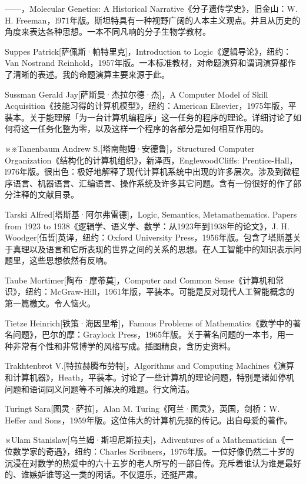 \documentclass[
  12pt,
  twoside,
  openright,
  oldfontcommands,
]{memoir}
\begin{document}
------，Molecular Genetics: A Historical
Narrative《分子遗传学史》，旧金山：W. H.
Freeman，l971年版。斯坦特具有一种视野广阔的人本主义观点。并且从历史的角度来表达各种思想。一本不同凡响的分子生物学教材。

Suppes Patrick{[}萨佩斯·帕特里克{]}，Introduction to
Logic《逻辑导论》，纽约：Van Nostrand
Reinhold，1957年版。一本标准教材，对命题演算和谓词演算都作了清晰的表述。我的命题演算主要来源于此。

Sussman Gerald Jay{[}萨斯曼·杰拉尔德·杰{]}，A Computer Model of Skill
Acquisition《技能习得的计算机模型》，纽约：American
Elsevier，1975年版，平装本。关于能理解「为一台计算机编程序」这一任务的程序的理论。详细讨论了如何将这一任务化整为零，以及这样一个程序的各部分是如何相互作用的。

※※Tanenbaum Andrew S.{[}塔南鲍姆·安德鲁{]}，Structured Computer
Organization《结构化的计算机组织》，新泽西，EnglewoodCliffs:
Prentice-Hall，l976年版。很出色：极好地解释了现代计算机系统中出现的许多层次。涉及到微程序语言、机器语言、汇编语言、操作系统及许多其它问题。含有一份很好的作了部分注释的文献目录。

Tarski Alfred{[}塔斯基·阿尔弗雷德{]}，Logic, Semantics, Metamathematics.
Papers from 1923 to
1938《逻辑学、语义学、数学：从1923年到1938年的论文》，J. H.
Woodger{[}伍哲{]}英译，纽约：Oxford University
Press，1956年版。包含了塔斯基关于真理以及语言和它所表现的世界之间的关系的思想。在人工智能中的知识表示问题里，这些思想依然有反响。

Taube Mortimer{[}陶布·摩蒂莫{]}，Computer and Common
Sense《计算机和常识》，纽约：McGraw-Hill，1961年版，平装本。可能是反对现代人工智能概念的第一篇檄文。令人恼火。

Tietze Heinrich{[}铁策·海因里希{]}，Famous Problems of
Mathematics《数学中的著名问题》，巴尔的摩：Graylock
Press，1965年版。关于著名问题的一本书，用一种非常有个性和非常博学的风格写成。插图精良，含历史资料。

Trakhtenbrot V.{[}特拉赫腾布劳特{]}，Algorithms and Computing
Machines《演算和计算机器》，Heath，平装本。讨论了一些计算机的理论问题，特别是诸如停机问题和语词同义问题等不可解决的难题。行文简洁。

Turingt Sara{[}图灵·萨拉{]}，Alan M. Turing《阿兰·图灵》，英国，剑桥：W.
Heffer and Sons，1959年版。这位伟大的计算机先驱的传记。出自母爱的著作。

※Ulam Stanislaw{[}乌兰姆·斯坦尼斯拉夫{]}，Adiventures of a
Mathematician《一位数学家的奇遇》，纽约：Charles
Scribner\textquotesingle s，1976年版。一位好像仍然二十岁的沉浸在对数学的热爱中的六十五岁的老人所写的一部自传。充斥着谁认为谁是最好的、谁嫉妒谁等这一类的闲话。不仅逗乐，还挺严肃。
\end{document}
